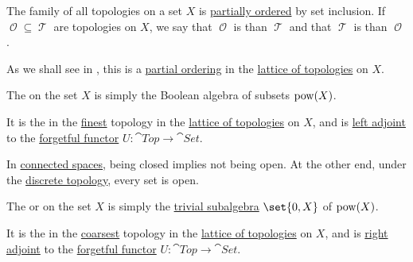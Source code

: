 \begin{definition}\label{def:topology_ordering}
  The family of all topologies on a set \( X \) is \hyperref[def:partially_ordered_set]{partially ordered} by set inclusion. If \( \mscrO \subseteq \mscrT \) are topologies on \( X \), we say that \( \mscrO \) is  than \( \mscrT \) and that \( \mscrT \) is  than \( \mscrO \).
\end{definition}
\begin{comments}
  \item As we shall see in , this is a \hyperref[def:partially_ordered_set]{partial ordering} in the \hyperref[thm:lattice_of_topologies]{lattice of topologies} on \( X \).
\end{comments}

\begin{definition}\label{def:discrete_topology}
  The  on the set \( X \) is simply the Boolean algebra of subsets \( \operatorname{pow}(X) \).
\end{definition}
\begin{comments}
  \item It is the in the \hyperref[def:topology_ordering]{finest} topology in the \hyperref[thm:lattice_of_topologies]{lattice of topologies} on \( X \), and is \hyperref[def:category_adjunction]{left adjoint} to the \hyperref[def:concrete_category]{forgetful functor} \( U: \cat{Top} \to \cat{Set} \).

  \item In \hyperref[def:connected_space]{connected spaces}, being closed implies not being open. At the other end, under the \hyperref[def:discrete_topology]{discrete topology}, every set is open.
\end{comments}

\begin{definition}\label{def:indiscrete_topology}
  The  or  on the set \( X \) is simply the \hyperref[def:boolean_algebra/trivial]{trivial subalgebra} \( \set{ 0, X } \) of \( \operatorname{pow}(X) \).
\end{definition}
\begin{comments}
  \item It is the in the \hyperref[def:topology_ordering]{coarsest} topology in the \hyperref[thm:lattice_of_topologies]{lattice of topologies} on \( X \), and is \hyperref[def:category_adjunction]{right adjoint} to the \hyperref[def:concrete_category]{forgetful functor} \( U: \cat{Top} \to \cat{Set} \).
\end{comments}

